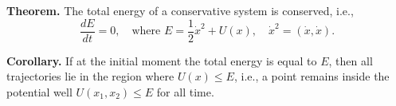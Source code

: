 \textbf{Theorem.} The total energy of a conservative system is conserved, i.e.,
$$\frac{dE}{dt} = 0, \quad \text{where } E = \frac{1}{2} \dot{x}^2 + U(x), \quad \dot{x}^2 = (\dot{x}, \dot{x}).$$

\textbf{Corollary.} If at the initial moment the total energy is equal to $E$, then all trajectories lie in the region where $U(x) \leq E$, i.e., a point remains inside the potential well $U(x_1, x_2) \leq E$ for all time.
